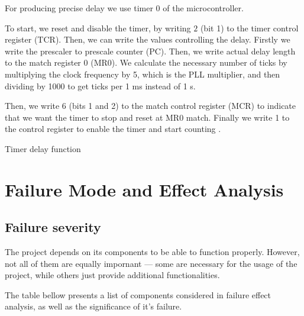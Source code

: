\documentclass[10pt]{article}
\newcommand{\code}[3]{}
\begin{document}
    For producing precise delay we use timer 0 of the microcontroller.
    
    To start, we reset and disable the timer, by writing $2$ (bit 1) to the timer control register (TCR). 
    Then, we can write the values controlling the delay.
    Firstly we write the prescaler to prescale counter (PC).
    Then, we write actual delay length to the match register 0 (MR0).
    We calculate the necessary number of ticks by multiplying the clock frequency by 5, which is the PLL multiplier, and then dividing by 1000 to get ticks per 1 ms instead of 1 s.

    Then, we write 6 (bits 1 and 2) to the match control register (MCR) to indicate that we want the timer to stop and reset at MR0 match.
    Finally we write 1 to the control register to enable the timer and start counting \cite[p.251]{lpc2148-manual}.

    \begin{program}[H]
        \code{11}{19}{timer.h}
        \caption{Timer delay function}
    \end{program}

    \section{Failure Mode and Effect Analysis}

    \subsection{Failure severity}

    The project depends on its components to be able to function properly.
    However, not all of them are equally impornant --- some are necessary for the usage of the project,
    while others just provide additional functionalities.

    The table bellow presents a list of components considered in failure effect analysis, as well as the significance of it's failure.
\end{document}
